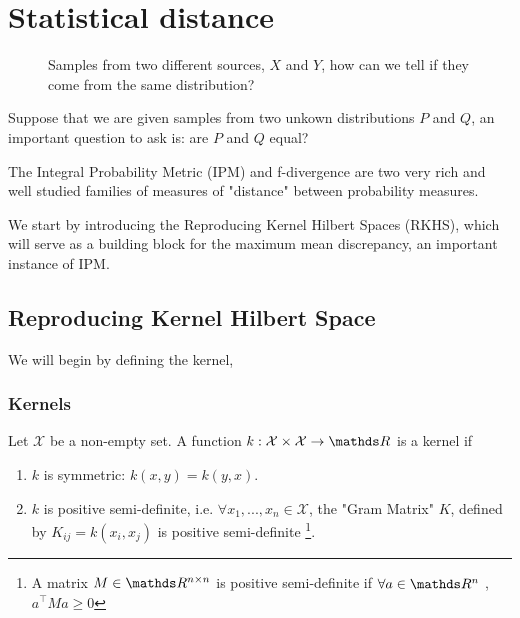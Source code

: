\chapter{Statistical distance}





\begin{figure}[H]
    \captionsetup[subfigure]{labelformat=empty}
    \centering
    \qquad
    \caption{Samples from two different sources, $X$ and $Y$, how can we tell if 
    they come from the same distribution?}
    \label{fig:scatter_dist_questions}%
\end{figure}


Suppose that we are given samples from two unkown distributions $P$ and $Q$, an 
important question to ask is: are $P$ and $Q$ equal?


The Integral Probability Metric (IPM) and f-divergence are two very rich and well studied
families of measures of "distance" between probability measures.

We start by introducing the Reproducing Kernel Hilbert Spaces (RKHS), which will serve as a 
building block for the maximum mean discrepancy, an important instance of IPM.

\section{Reproducing Kernel Hilbert Space}

We will begin by defining the kernel,

\subsection{Kernels}

\begin{definition}
    Let $\mathcal{X}$ be a non-empty set. A function 
    $k: \mathcal{X} \times \mathcal{X} \rightarrow \R$ is a kernel if 
    \begin{enumerate}
        \item $k$ is symmetric: $k(x, y) = k(y, x)$.
        \item $k$ is positive semi-definite, i.e. $\forall x_1, ..., x_n \in \mathcal{X}$,
        the "Gram Matrix" $K$, defined by $K_{ij} = k(x_i, x_j)$ is positive semi-definite
        \footnote{A matrix $M \in \R^{n\times n}$ is positive semi-definite if $\forall a \in \R^n$
        , $a^\intercal Ma \geq 0$}.
    \end{enumerate}
\end{definition}

